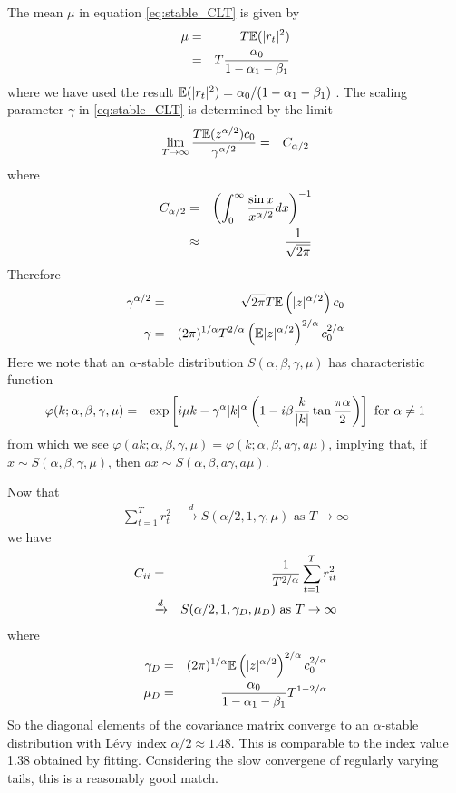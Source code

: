 \documentclass{report}
\begin{document}
The mean $\mu$ in equation \ref{eq:stable_CLT} is given by
\begin{eqnarray*}
  \mu &=& T \mathbb{E}(|r_t|^2) \\
  &=& T{\alpha_0 \over 1 - \alpha_1 - \beta_1}
\end{eqnarray*}
where we have used the result $\mathbb{E}(|r_t|^2) = \alpha_0 / (1 - \alpha_1
- \beta_1)$ \cite{Bollerslev86}. The scaling parameter $\gamma$ in
\ref{eq:stable_CLT} is determined by the limit \cite{Bilik2008}
\begin{eqnarray*}
  \lim_{T\to\infty} {T \mathbb{E}(z^{\alpha/2}) c_0 \over \gamma^{\alpha/2}}
  &=& C_{\alpha/2}
\end{eqnarray*}
where
\begin{eqnarray*}
  C_{\alpha/2} &=& \left( \int_0^\infty {\sin x \over x^{\alpha/2}} dx
  \right)^{-1} \\
  &\approx& {1 \over \sqrt{2 \pi}}
\end{eqnarray*}
Therefore
\begin{eqnarray*}
  \gamma^{\alpha/2} &=& \sqrt{2\pi} T \mathbb{E}\left(
    |z|^{\alpha/2}
  \right) c_0 \\
  \gamma &=& (2\pi)^{1/\alpha} T^{2/\alpha} \left(\mathbb{E}
    |z|^{\alpha/2}
  \right)^{2/\alpha} c_0^{2/\alpha}
\end{eqnarray*}
Here we note that an $\alpha$-stable distribution $S(\alpha, \beta,
\gamma, \mu)$ has characteristic function \cite{Guhr2007}
\begin{eqnarray*}
  \varphi(k; \alpha, \beta, \gamma, \mu) &=& \exp\left[
    i\mu k - \gamma^\alpha |k|^\alpha \left(
      1 - i \beta {k \over |k|} \tan{\pi \alpha \over 2}
    \right) \right] \text{ for $\alpha \neq 1$}
\end{eqnarray*}
from which we see $\varphi(ak; \alpha, \beta, \gamma, \mu) = \varphi(k;
\alpha, \beta, a\gamma, a\mu)$, implying that, if $x \sim S(\alpha,
\beta, \gamma, \mu)$, then $ax \sim S(\alpha, \beta, a\gamma, a\mu)$.

Now that
\begin{eqnarray*}
  \sum_{t=1}^T r_t^2 &\xrightarrow{d} S(\alpha/2,
  1, \gamma, \mu) \text{ as $T \to \infty$}  
\end{eqnarray*}
we have
\begin{eqnarray}
  C_{ii} &=& {1 \over T^{2/\alpha}}\sum_{t=1}^T r_{it}^2 \\
  &\xrightarrow{d}&
  S(\alpha/2, 1, \gamma_D, \mu_D) \text{ as $T \to \infty$}
  \label{eq:garch_cii_dist}
\end{eqnarray}
where
\begin{eqnarray}\label{eq:garch_wishart_cij_params}
  \gamma_D &=& (2\pi)^{1/\alpha} \mathbb{E}\left(|z|^{\alpha/2}
  \right)^{2/\alpha} c_0^{2/\alpha} \\
  \mu_D &=& {\alpha_0 \over 1 - \alpha_1 - \beta_1} T^{1 - 2/\alpha}
  \nonumber
\end{eqnarray}
So the diagonal elements of the covariance matrix converge to
an $\alpha$-stable distribution with L\'evy index $\alpha/2 \approx
1.48$. This is comparable to the index value 1.38 obtained by
fitting. Considering the slow convergene of regularly varying tails,
this is a reasonably good match.
\end{document}
